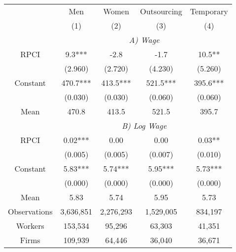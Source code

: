 \begin{tabular}{ccccc}
\toprule
\toprule
      & Men   & Women & Outsourcing & Temporary \\
      & (1)   & (2)   & (3)   & (4) \\
\cmidrule{2-5}      & \multicolumn{4}{c}{\textit{A) Wage}} \\
\midrule
RPCI  & 9.3*** & -2.8  & -1.7  & 10.5** \\
      & (2.960) & (2.720) & (4.230) & (5.260) \\
Constant & 470.7*** & 413.5*** & 521.5*** & 395.6*** \\
      & (0.030) & (0.030) & (0.060) & (0.060) \\
Mean  & 470.8 & 413.5 & 521.5 & 395.7 \\
\cmidrule{2-5}      & \multicolumn{4}{c}{\textit{B) Log Wage}} \\
\midrule
RPCI  & 0.02*** & 0.00  & 0.00  & 0.03** \\
      & (0.005) & (0.005) & (0.007) & (0.010) \\
Constant & 5.83*** & 5.74*** & 5.95*** & 5.73*** \\
      & (0.000) & (0.000) & (0.000) & (0.000) \\
Mean  & 5.83  & 5.74  & 5.95  & 5.73 \\
\midrule
Observations & 3,636,851 & 2,276,293 & 1,529,005 & 834,197 \\
Workers & 153,534 & 95,296 & 63,303 & 41,351 \\
Firms & 109,939 & 64,446 & 36,040 & 36,671 \\
\bottomrule
\bottomrule
\end{tabular}%

